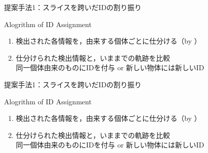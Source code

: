 \begin{frame}[noframenumbering]{提案手法1：スライスを跨いだIDの割り振り}
    \begin{block}{Alogrithm of ID Assignment}
        \begin{enumerate}
            \item 検出された各情報を，由来する個体ごとに仕分ける（by \textbf{}）
            \item 仕分けられた検出情報と，いままでの軌跡を比較 
            \\\ra 同一個体由来のものにIDを付与 or 新しい物体には新しいID
        \end{enumerate}
    \end{block}
\end{frame}
\begin{frame}[noframenumbering]{提案手法1：スライスを跨いだIDの割り振り}
    \begin{block}{Alogrithm of ID Assignment}
        \begin{enumerate}
            \item 検出された各情報を，由来する個体ごとに仕分ける（by \textbf{}）
            \item 仕分けられた検出情報と，いままでの軌跡を比較 
            \\\ra 同一個体由来のものにIDを付与 or 新しい物体には新しいID
        \end{enumerate}
    \end{block}
\end{frame}

